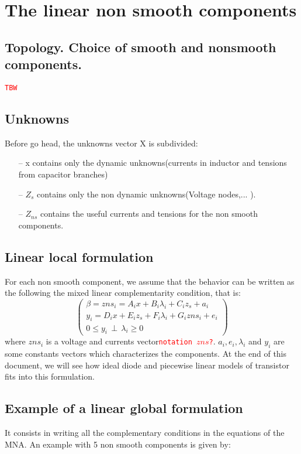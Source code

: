 


\section{The linear non smooth components}
\subsection{Topology. Choice of smooth and nonsmooth components.}
\textcolor{red}{\tt TBW}
\subsection{Unknowns}
Before go head, the unknowns vector X is subdivided:
\begin{enumerate}
\item[--] x contains only the dynamic unknowns(currents in inductor and tensions from capacitor branches)
\item[--] $Z_{s}$ contains only the non dynamic unknowns(Voltage nodes,... ).
\item[--] $Z_{ns}$ contains the useful currents and tensions for the non smooth components.
\end{enumerate}
\subsection{Linear local formulation}
For each non smooth component, we assume that the behavior can be written as the following the mixed linear  complementarity condition, that is:
\begin{equation}\left(\begin{array}{c}
\beta = zns_{i} = A_{i}x+B_{i}\lambda_{i}+C_{i}z_{s} + a_{i}\\
y_{i}=D_{i}x+E_{i}z_{s}+F_{i}\lambda_{i}+G_{i}zns_{i}+e_{i}\\
0 \leq y_{i} \, \perp \, \lambda_{i} \geq 0
\end{array}\right)
\end{equation}
where $zns_{i}$ is a voltage and currents vector\textcolor{red}{\tt notation $zns$?}. $a_{i},e_{i},\lambda_{i}$ and $y_{i}$ are some constants vectors which characterizes the components. At the end
of this document, we will see how ideal diode and piecewise linear models of transistor fits into this formulation.


\subsection{Example of a linear global formulation}
It consists in writing all the complementary conditions in the equations of the MNA. An example with 5 non smooth components is given by:

